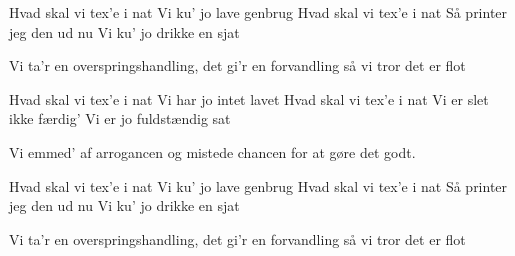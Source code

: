 \documentclass[a4paper,11pt]{article}
\begin{document}
\begin{song}
 Hvad skal vi tex'e i nat
 Vi ku' jo lave genbrug
 Hvad skal vi tex'e i nat
 Så printer jeg den ud nu
 Vi ku' jo drikke en sjat

 Vi ta'r en overspringshandling, det gi'r en forvandling
så vi tror det er flot


 Hvad skal vi tex'e i nat
 Vi har jo intet lavet
 Hvad skal vi tex'e i nat
Vi er slet ikke færdig'
 Vi er jo fuldstændig sat

 Vi emmed' af arrogancen og mistede chancen
for at gøre det godt.

 Hvad skal vi tex'e i nat
 Vi ku' jo lave genbrug
 Hvad skal vi tex'e i nat
 Så printer jeg den ud nu
 Vi ku' jo drikke en sjat

 Vi ta'r en overspringshandling, det gi'r en forvandling
så vi tror det er flot

\end{song}
\end{document}

